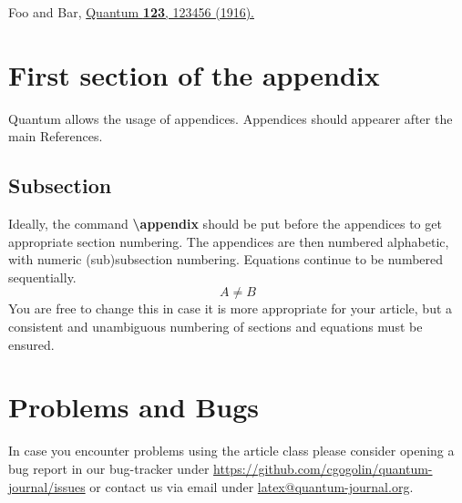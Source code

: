 \documentclass[prx,a4paper,aps,twocolumn,superscriptaddress,11pt]{quantumarticle}
\begin{document}

\begin{thebibliography}{9}
  Foo and Bar,
  \href{https://doi.org/10.22331/
        idonotexist}{Quantum
        \textbf{123}, 123456 (1916).}
\end{thebibliography}

\appendix

\section{First section of the appendix}
Quantum allows the usage of appendices.
Appendices should appearer after the main References.

\subsection{Subsection}
Ideally, the command \textbf{\textbackslash{}appendix} should be put before the appendices to get appropriate section numbering.
The appendices are then numbered alphabetic, with numeric (sub)subsection numbering.
Equations continue to be numbered sequentially.
\begin{equation}
  A \neq B
\end{equation}
You are free to change this in case it is more appropriate for your article, but a consistent and unambiguous numbering of sections and equations must be ensured.

\section{Problems and Bugs}
In case you encounter problems using the article class please consider opening a bug report in our bug-tracker under \href{https://github.com/cgogolin/quantum-journal/issues}{https://github.com/cgogolin/quantum-journal/issues} or contact us via email under \href{mailto:latex@quantum-journal.org}{latex@quantum-journal.org}.
\end{document}
